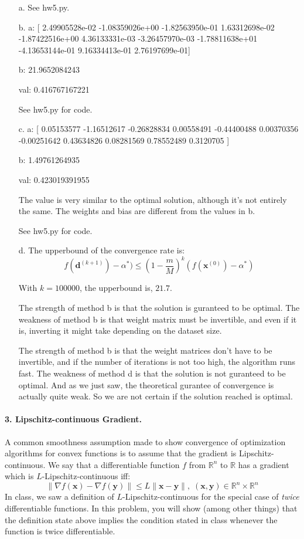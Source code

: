 \documentclass[11pt]{article}
\theoremstyle{remark}
\newcommand{\R}{\mathbb{R}}                     %
\newcommand{\bx}{\mathbf{x}}
\newcommand{\by}{\mathbf{y}}
\newcommand{\bd}{\mathbf{d}}
\begin{document}
\color{blue}
\begin{itemize}
\item[a.] See hw5.py.
\item[b.] a: [  2.49905528e-02  -1.08359026e+00  -1.82563950e-01   1.63312698e-02
  -1.87422516e+00   4.36133331e-03  -3.26457970e-03  -1.78811638e+01
  -4.13653144e-01   9.16334413e-01   2.76197699e-01] 
  
b: 21.9652084243 

val: 0.416767167221

See hw5.py for code.

\item [c.]
a: [ 0.05153577 -1.16512617 -0.26828834  0.00558491 -0.44400488  0.00370356
 -0.00251642  0.43634826  0.08281569  0.78552489  0.3120705 ] 
 
b: 1.49761264935 

val: 0.423019391955

The value is very similar to the optimal solution, although it's not entirely the same. The weights and bias are different from the values in b.

See hw5.py for code.

\item[d.]
The upperbound of the convergence rate is:
$$f(\bd^{(k+1)})-\alpha^*) \leq (1-\frac{m}{M})^k (f(\bx^{(0)})-\alpha^*)$$

With $k=100000$, the upperbound is, $21.7$.

The strength of method b is that the solution is guranteed to be optimal. The weakness of method b is that weight matrix must be invertible, and even if it is, inverting it might take depending on the dataset size. 

The strength of method b is that the weight matrices don't have to be invertible, and if the number of iterations is not too high, the algorithm runs fast. The weakness of method d is that the solution is not guranteed to be optimal. And as we just saw, the theoretical gurantee of convergence is actually quite weak. So we are not certain if the solution reached is optimal.

\end{itemize}
\color{black}

\paragraph{3. Lipschitz-continuous Gradient.} A common smoothness assumption
made to show convergence of optimization algorithms for convex functions is to
assume that the gradient is Lipschitz-continuous. 
We say that a differentiable
function $f$ from $\R^n$ to $\R$ has a gradient which is
$L$-Lipschitz-continuous iff:
\begin{displaymath}
    \|\nabla f(\bx) - \nabla f(\by)\| \leq L\|\bx-\by\|,\;
    (\bx,\by)\in\R^n\times\R^n
\end{displaymath}
In class, we saw a definition of $L$-Lipschitz-continuous for the
special case of \emph{twice} differentiable functions.
In this problem, you will show (among other things) that the
definition state above implies the condition stated in class whenever
the function is twice differentiable.
\end{document}
